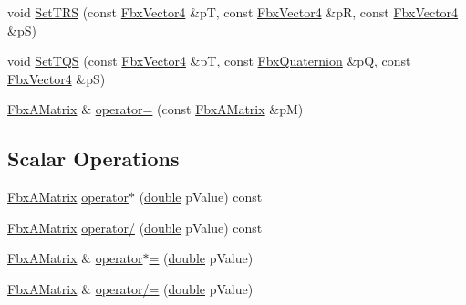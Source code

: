 \begin{DoxyCompactItemize}
void \hyperlink{class_fbx_a_matrix_aed884627dc4f4416bbf068b77bae8ae1}{Set\+T\+RS} (const \hyperlink{class_fbx_vector4}{Fbx\+Vector4} \&pT, const \hyperlink{class_fbx_vector4}{Fbx\+Vector4} \&pR, const \hyperlink{class_fbx_vector4}{Fbx\+Vector4} \&pS)
\item 
void \hyperlink{class_fbx_a_matrix_af3761d1426a403b7b86fd5b2c11349c8}{Set\+T\+QS} (const \hyperlink{class_fbx_vector4}{Fbx\+Vector4} \&pT, const \hyperlink{class_fbx_quaternion}{Fbx\+Quaternion} \&pQ, const \hyperlink{class_fbx_vector4}{Fbx\+Vector4} \&pS)
\item 
\hyperlink{class_fbx_a_matrix}{Fbx\+A\+Matrix} \& \hyperlink{class_fbx_a_matrix_a77b179193309b11d5c505cdca7969ee0}{operator=} (const \hyperlink{class_fbx_a_matrix}{Fbx\+A\+Matrix} \&pM)
\end{DoxyCompactItemize}
\subsection*{Scalar Operations}
\begin{DoxyCompactItemize}
\item 
\hyperlink{class_fbx_a_matrix}{Fbx\+A\+Matrix} \hyperlink{class_fbx_a_matrix_abc19f68d91ce2dd5303c9ab398e12eee}{operator$\ast$} (\hyperlink{class_fbx_a_matrix_ad463edbb9fea344643297701f159faa7}{double} p\+Value) const
\item 
\hyperlink{class_fbx_a_matrix}{Fbx\+A\+Matrix} \hyperlink{class_fbx_a_matrix_a48795bab1963bb8f5d963080f3d04149}{operator/} (\hyperlink{class_fbx_a_matrix_ad463edbb9fea344643297701f159faa7}{double} p\+Value) const
\item 
\hyperlink{class_fbx_a_matrix}{Fbx\+A\+Matrix} \& \hyperlink{class_fbx_a_matrix_a0b408712fcb77126c4a8f951ae8a219f}{operator$\ast$=} (\hyperlink{class_fbx_a_matrix_ad463edbb9fea344643297701f159faa7}{double} p\+Value)
\item 
\hyperlink{class_fbx_a_matrix}{Fbx\+A\+Matrix} \& \hyperlink{class_fbx_a_matrix_af77d3a14cae3687b56d7e14e326473d6}{operator/=} (\hyperlink{class_fbx_a_matrix_ad463edbb9fea344643297701f159faa7}{double} p\+Value)
\end{DoxyCompactItemize}
